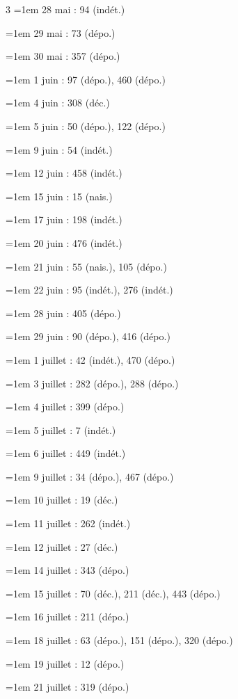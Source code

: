 \begin{multicols}{3}
\hangindent=1em 28 mai : 94 (indét.)\par
\hangindent=1em 29 mai : 73 (dépo.)\par
\hangindent=1em 30 mai : 357 (dépo.)\par
\hangindent=1em 1 juin : 97 (dépo.), 460 (dépo.)\par
\hangindent=1em 4 juin : 308 (déc.)\par
\hangindent=1em 5 juin : 50 (dépo.), 122 (dépo.)\par
\hangindent=1em 9 juin : 54 (indét.)\par
\hangindent=1em 12 juin : 458 (indét.)\par
\hangindent=1em 15 juin : 15 (nais.)\par
\hangindent=1em 17 juin : 198 (indét.)\par
\hangindent=1em 20 juin : 476 (indét.)\par
\hangindent=1em 21 juin : 55 (nais.), 105 (dépo.)\par
\hangindent=1em 22 juin : 95 (indét.), 276 (indét.)\par
\hangindent=1em 28 juin : 405 (dépo.)\par
\hangindent=1em 29 juin : 90 (dépo.), 416 (dépo.)\par
\hangindent=1em 1 juillet : 42 (indét.), 470 (dépo.)\par
\hangindent=1em 3 juillet : 282 (dépo.), 288 (dépo.)\par
\hangindent=1em 4 juillet : 399 (dépo.)\par
\hangindent=1em 5 juillet : 7 (indét.)\par
\hangindent=1em 6 juillet : 449 (indét.)\par
\hangindent=1em 9 juillet : 34 (dépo.), 467 (dépo.)\par
\hangindent=1em 10 juillet : 19 (déc.)\par
\hangindent=1em 11 juillet : 262 (indét.)\par
\hangindent=1em 12 juillet : 27 (déc.)\par
\hangindent=1em 14 juillet : 343 (dépo.)\par
\hangindent=1em 15 juillet : 70 (déc.), 211 (déc.), 443 (dépo.)\par
\hangindent=1em 16 juillet : 211 (dépo.)\par
\hangindent=1em 18 juillet : 63 (dépo.), 151 (dépo.), 320 (dépo.)\par
\hangindent=1em 19 juillet : 12 (dépo.)\par
\hangindent=1em 21 juillet : 319 (dépo.)\par

\end{multicols}
